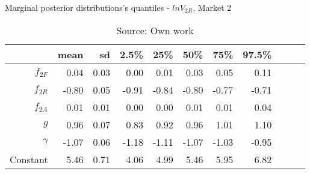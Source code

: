 \begin{table}[H]
\caption{Marginal posterior distributions's quantiles - $ln V_{2R}$,  Market 2}
\centering
\begin{tabular}{rrrrrrrrrrr}
  \toprule
           & mean  & sd   & 2.5\% & 25\%  & 50\%  & 75\%  & 97.5\%\\ 
  \hline
  $f_{2F}$ & 0.04  & 0.03 & 0.00  & 0.01  & 0.03  & 0.05  & 0.11  \\ 
  $f_{2R}$ & -0.80 & 0.05 & -0.91 & -0.84 & -0.80 & -0.77 & -0.71 \\ 
  $f_{2A}$ & 0.01  & 0.01 & 0.00  & 0.00  & 0.01  & 0.01  & 0.04  \\ 
  $g$      & 0.96  & 0.07 & 0.83  & 0.92  & 0.96  & 1.01  & 1.10  \\ 
  $\gamma$ & -1.07 & 0.06 & -1.18 & -1.11 & -1.07 & -1.03 & -0.95 \\ 
  Constant & 5.46  & 0.71 & 4.06  & 4.99  & 5.46  & 5.95  & 6.82  \\ 
     \bottomrule
\end{tabular}
\caption*{Source: Own work}
\end{table}
